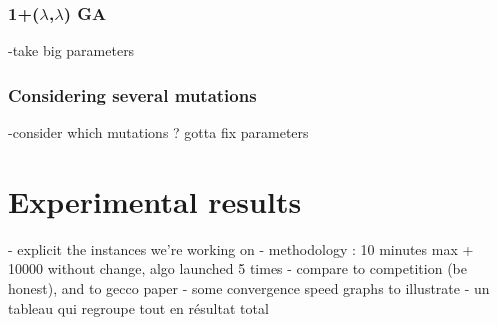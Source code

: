 \documentclass[a4paper]{article}
\begin{document}
\subsubsection{1+($\lambda$,$\lambda$) GA}
-take big parameters
\subsubsection{Considering several mutations}
-consider which mutations ? gotta fix parameters
\section{Experimental results}
- explicit the instances we're working on
- methodology : 10 minutes max + 10000 without change, algo launched 5 times
- compare to competition (be honest), and to gecco paper
- some convergence speed graphs to illustrate
- un tableau qui regroupe tout en résultat total
\end{document}
